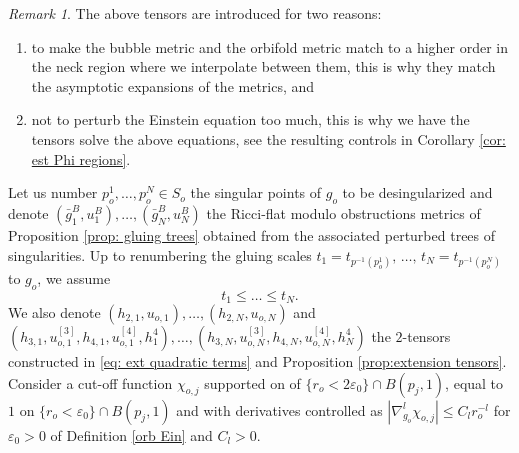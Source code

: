 \documentclass[11pt,reqno]{amsart}
\numberwithin{equation}{section}
\theoremstyle{definition}
\theoremstyle{remark}
\newtheorem{remark}[thm]{Remark}
\begin{document}
\begin{remark}
    The above tensors are introduced for two reasons:
\begin{enumerate}
    \item to make the bubble metric and the orbifold metric match to a higher order in the neck region where we interpolate between them, this is why they match the asymptotic expansions of the metrics, and
    \item not to perturb the Einstein equation too much, this is why we have the tensors solve the above equations, see the resulting controls in Corollary \ref{cor: est Phi regions}.
\end{enumerate}
\end{remark}
Let us number $p_o^1,\dots,p_o^N\in S_{o}$ the singular points of $g_o$ to be desingularized and denote $(\bar{g}^B_1, u^B_1),\dots,(\bar{g}^B_{N},u^B_N)$ the Ricci-flat modulo obstructions metrics of Proposition \ref{prop: gluing trees} obtained from the associated perturbed trees of singularities. Up to renumbering the gluing scales $t_1 = t_{p^{-1}(p_o^1)},\,\dots,\, t_N = t_{p^{-1}(p_o^N)}$ to $g_o$, we assume
$$t_1\leqslant\dots\leqslant t_N.$$ We also denote $(h_{2,1},u_{o,1}),\dots, (h_{2,N},u_{o,N})$ and $(h_{3,1},u_{o,1}^{[3]},h_{4,1},u_{o,1}^{[4]},h^4_1),\dots,(h_{3,N},u_{o,N}^{[3]},h_{4,N},u_{o,N}^{[4]},h^4_N)$ the $2$-tensors constructed in \eqref{eq: ext quadratic terms} and Proposition \ref{prop:extension tensors}. Consider a cut-off function $\chi_{o,j}$ supported on of $\{r_o<2\varepsilon_0\}\cap B(p_j,1)$, equal to $1$ on $\{r_o<\varepsilon_0\}\cap B(p_j,1)$ and with derivatives controlled as $|\nabla_{g_o}^l\chi_{o,j}|\leqslant C_l r_o^{-l}$ for $\varepsilon_0>0$ of Definition \ref{orb Ein} and $C_l>0$. 
\end{document}
